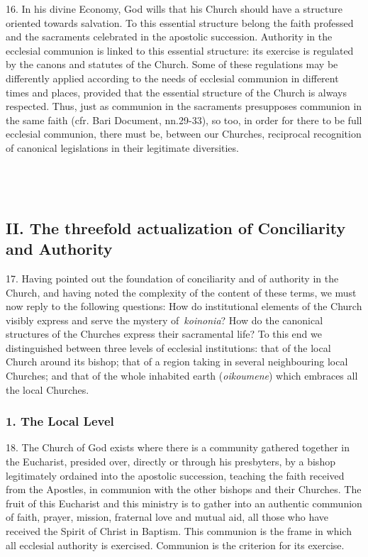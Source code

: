 16. In his divine Economy, God wills that his Church should have a
structure oriented towards salvation. To this essential structure belong
the faith professed and the sacraments celebrated in the apostolic
succession. Authority in the ecclesial communion is linked to this
essential structure: its exercise is regulated by the canons and
statutes of the Church. Some of these regulations may be differently
applied according to the needs of ecclesial communion in different times
and places, provided that the essential structure of the Church is
always respected. Thus, just as communion in the sacraments presupposes
communion in the same faith (cfr. Bari Document, nn.29-33), so too, in
order for there to be full ecclesial communion, there must be, between
our Churches, reciprocal recognition of canonical legislations in their
legitimate diversities.

\subsection{\texorpdfstring{\textbf{~}}{~}}\label{section-2}

\subsection{II. The threefold actualization of Conciliarity and
Authority}\label{ii.-the-threefold-actualization-of-conciliarity-and-authority}

17. Having pointed out the foundation of conciliarity and of authority
in the Church, and having noted the complexity of the content of these
terms, we must now reply to the following questions: How do
institutional elements of the Church visibly express and serve the
mystery of~\emph{koinonia}? How do the canonical structures of the
Churches express their sacramental life? To this end we distinguished
between three levels of ecclesial institutions: that of the local Church
around its bishop; that of a region taking in several neighbouring local
Churches; and that of the whole inhabited earth (\emph{oikoumene}) which
embraces all the local Churches.

\subsubsection{1. The Local Level}\label{the-local-level}

18. The Church of God exists where there is a community gathered
together in the Eucharist, presided over, directly or through his
presbyters, by a bishop legitimately ordained into the apostolic
succession, teaching the faith received from the Apostles, in communion
with the other bishops and their Churches. The fruit of this Eucharist
and this ministry is to gather into an authentic communion of faith,
prayer, mission, fraternal love and mutual aid, all those who have
received the Spirit of Christ in Baptism. This communion is the frame in
which all ecclesial authority is exercised. Communion is the criterion
for its exercise.

